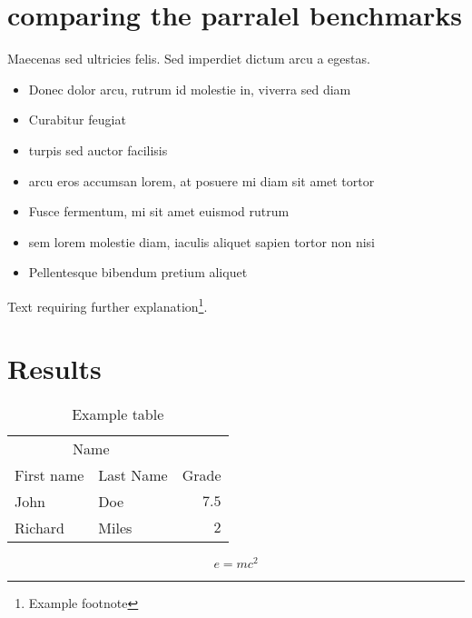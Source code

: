 \documentclass[twoside,twocolumn]{article}
\begin{document}

\section{comparing the parralel benchmarks}

Maecenas sed ultricies felis. Sed imperdiet dictum arcu a egestas. 
\begin{itemize}
\item Donec dolor arcu, rutrum id molestie in, viverra sed diam
\item Curabitur feugiat
\item turpis sed auctor facilisis
\item arcu eros accumsan lorem, at posuere mi diam sit amet tortor
\item Fusce fermentum, mi sit amet euismod rutrum
\item sem lorem molestie diam, iaculis aliquet sapien tortor non nisi
\item Pellentesque bibendum pretium aliquet
\end{itemize}
\blindtext %

Text requiring further explanation\footnote{Example footnote}.


\section{Results}

\begin{table}
\caption{Example table}
\centering
\begin{tabular}{llr}
\toprule
\multicolumn{2}{c}{Name} \\
\cmidrule(r){1-2}
First name & Last Name & Grade \\
\midrule
John & Doe & $7.5$ \\
Richard & Miles & $2$ \\
\bottomrule
\end{tabular}
\end{table}

\blindtext %

\begin{equation}
\label{eq:emc}
e = mc^2
\end{equation}

\blindtext %

\end{document}
